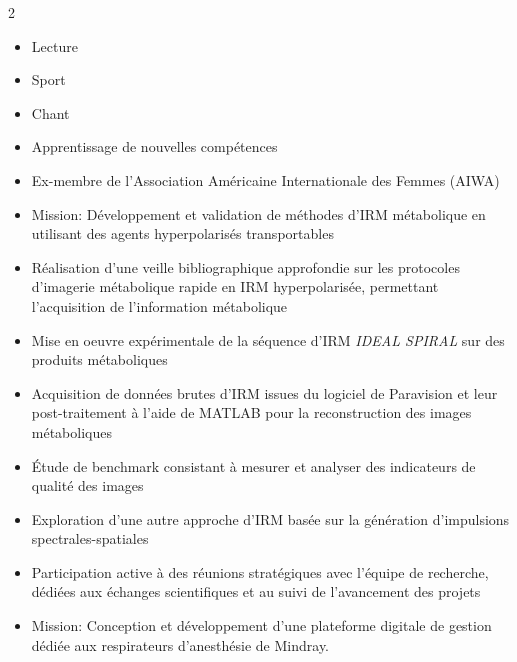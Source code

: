 \documentclass[8pt,a4paper]{altacv}
\begin{document}
\begin{paracol}{2}
\begin{itemize}
  \item Lecture
  \item Sport
  \item Chant
  \item Apprentissage de nouvelles compétences
  \item Ex-membre de l'Association Américaine Internationale des Femmes (AIWA)
\end{itemize}

\switchcolumn
{}
\begin{itemize}
  \setlength{\itemsep}{2.8pt}
  \setlength{\topsep}{1.2pt}
  \item Mission: Développement et validation de méthodes d’IRM métabolique en utilisant des agents hyperpolarisés transportables
  \item Réalisation d’une veille bibliographique approfondie sur les protocoles d’imagerie métabolique rapide en IRM hyperpolarisée, permettant l’acquisition de l’information métabolique
  \item Mise en oeuvre expérimentale de la séquence d’IRM \textit{IDEAL SPIRAL} sur des produits métaboliques
  \item Acquisition de données brutes d'IRM issues du logiciel de Paravision et leur post-traitement à l’aide de MATLAB pour la reconstruction des images métaboliques
  \item Étude de benchmark consistant à mesurer et analyser des indicateurs de qualité des images
  \item Exploration d’une autre approche d'IRM basée sur la génération d’impulsions spectrales-spatiales
  \item Participation active à des réunions stratégiques avec l’équipe de recherche, dédiées aux échanges scientifiques et au suivi de l’avancement des projets
\end{itemize}
\vspace{2pt}
\begin{itemize}
  \item Mission: Conception et développement d’une plateforme digitale de gestion dédiée aux respirateurs d’anesthésie de Mindray.

\end{itemize}
\end{paracol}
\end{document}

